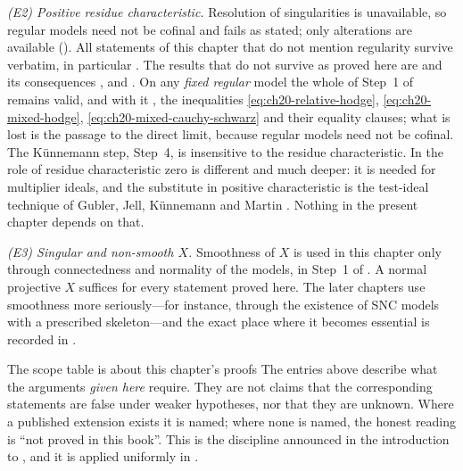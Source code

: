 \emph{(E2) Positive residue characteristic.}  Resolution of singularities is
unavailable, so regular models need not be cofinal and
 fails as stated; only alterations are available
().  All statements of this chapter that do
not mention regularity survive verbatim, in particular
.
The results that do not survive as proved here are
 and its consequences
,  and
.  On any \emph{fixed regular}
model the whole of Step~1 of  remains valid, and
with it , the inequalities
\eqref{eq:ch20-relative-hodge}, \eqref{eq:ch20-mixed-hodge},
\eqref{eq:ch20-mixed-cauchy-schwarz} and their equality clauses; what is
lost is the passage to the direct limit, because regular models need not be
cofinal.  The Künnemann step, Step~4, is insensitive to the residue
characteristic.  In
 the role of residue
characteristic zero is different and much deeper: it is needed for
multiplier ideals, and the substitute in positive characteristic is the
test-ideal technique of Gubler, Jell, K\"unnemann and Martin
\cite{GJKM19}.  Nothing in the present chapter depends on that.

\emph{(E3) Singular and non-smooth $X$.}  Smoothness of $X$ is used in
this chapter only through connectedness and normality of the models, in
Step~1 of .  A normal projective $X$ suffices
for every statement proved here.  The later chapters use smoothness more
seriously---for instance, through the existence of SNC models with a
prescribed skeleton---and the exact place where it becomes essential is
recorded in .

\begin{warning}{The scope table is about this chapter's proofs}
The entries above describe what the arguments \emph{given here} require.
They are not claims that the corresponding statements are false under weaker
hypotheses, nor that they are unknown.  Where a published extension exists
it is named; where none is named, the honest reading is ``not proved in this
book''.  This is the discipline announced in the introduction to
, and it is applied uniformly in
.
\end{warning}

